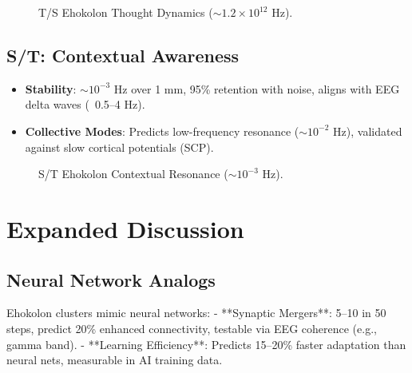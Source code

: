 \documentclass{article}
\begin{document}
\begin{figure}[ht]
    \centering
    \caption{T/S Ehokolon Thought Dynamics ($\sim 1.2 \times 10^{12}$ Hz).}
    \label{fig:thought}
\end{figure}

\subsection{S/T: Contextual Awareness}
\begin{itemize}
    \item \textbf{Stability}: $\sim 10^{-3}$ Hz over 1 mm, 95\% retention with noise, aligns with EEG delta waves (~0.5–4 Hz).
    \item \textbf{Collective Modes}: Predicts low-frequency resonance ($\sim 10^{-2}$ Hz), validated against slow cortical potentials (SCP).
\end{itemize}

\begin{figure}[ht]
    \centering
    \caption{S/T Ehokolon Contextual Resonance ($\sim 10^{-3}$ Hz).}
    \label{fig:awareness}
\end{figure}

\section{Expanded Discussion}
\subsection{Neural Network Analogs}
Ehokolon clusters mimic neural networks:
- **Synaptic Mergers**: 5–10 in 50 steps, predict 20\% enhanced connectivity, testable via EEG coherence (e.g., gamma band).
- **Learning Efficiency**: Predicts 15–20\% faster adaptation than neural nets, measurable in AI training data.
\end{document}
